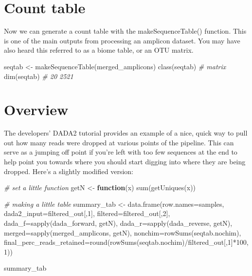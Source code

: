 \documentclass[
]{book}
\newenvironment{Shaded}{\begin{snugshade}}{\end{snugshade}}
\newcommand{\AttributeTok}[1]{\textcolor[rgb]{0.77,0.63,0.00}{#1}}
\newcommand{\CommentTok}[1]{\textcolor[rgb]{0.56,0.35,0.01}{\textit{#1}}}
\newcommand{\ControlFlowTok}[1]{\textcolor[rgb]{0.13,0.29,0.53}{\textbf{#1}}}
\newcommand{\DecValTok}[1]{\textcolor[rgb]{0.00,0.00,0.81}{#1}}
\newcommand{\FunctionTok}[1]{\textcolor[rgb]{0.00,0.00,0.00}{#1}}
\newcommand{\NormalTok}[1]{#1}
\newcommand{\OtherTok}[1]{\textcolor[rgb]{0.56,0.35,0.01}{#1}}
\newcommand{\SpecialCharTok}[1]{\textcolor[rgb]{0.00,0.00,0.00}{#1}}
\begin{document}
\hypertarget{count-table}{%
\section{Count table}\label{count-table}}

Now we can generate a count table with the makeSequenceTable() function. This is one of the main outputs from processing an amplicon dataset. You may have also heard this referred to as a biome table, or an OTU matrix.

\begin{Shaded}
\begin{Highlighting}[]
\NormalTok{seqtab }\OtherTok{\textless{}{-}} \FunctionTok{makeSequenceTable}\NormalTok{(merged\_amplicons)}
\FunctionTok{class}\NormalTok{(seqtab) }\CommentTok{\# matrix}
\FunctionTok{dim}\NormalTok{(seqtab) }\CommentTok{\# 20 2521}
\end{Highlighting}
\end{Shaded}

\hypertarget{overview}{%
\section{Overview}\label{overview}}

The developers' DADA2 tutorial provides an example of a nice, quick way to pull out how many reads were dropped at various points of the pipeline. This can serve as a jumping off point if you're left with too few sequences at the end to help point you towards where you should start digging into where they are being dropped. Here's a slightly modified version:

\begin{Shaded}
\begin{Highlighting}[]
  \CommentTok{\# set a little function}
\NormalTok{getN }\OtherTok{\textless{}{-}} \ControlFlowTok{function}\NormalTok{(x) }\FunctionTok{sum}\NormalTok{(}\FunctionTok{getUniques}\NormalTok{(x))}

  \CommentTok{\# making a little table}
\NormalTok{summary\_tab }\OtherTok{\textless{}{-}} \FunctionTok{data.frame}\NormalTok{(}\AttributeTok{row.names=}\NormalTok{samples, }\AttributeTok{dada2\_input=}\NormalTok{filtered\_out[,}\DecValTok{1}\NormalTok{],}
               \AttributeTok{filtered=}\NormalTok{filtered\_out[,}\DecValTok{2}\NormalTok{], }\AttributeTok{dada\_f=}\FunctionTok{sapply}\NormalTok{(dada\_forward, getN),}
               \AttributeTok{dada\_r=}\FunctionTok{sapply}\NormalTok{(dada\_reverse, getN), }\AttributeTok{merged=}\FunctionTok{sapply}\NormalTok{(merged\_amplicons, getN),}
               \AttributeTok{nonchim=}\FunctionTok{rowSums}\NormalTok{(seqtab.nochim),}
               \AttributeTok{final\_perc\_reads\_retained=}\FunctionTok{round}\NormalTok{(}\FunctionTok{rowSums}\NormalTok{(seqtab.nochim)}\SpecialCharTok{/}\NormalTok{filtered\_out[,}\DecValTok{1}\NormalTok{]}\SpecialCharTok{*}\DecValTok{100}\NormalTok{, }\DecValTok{1}\NormalTok{))}

\NormalTok{summary\_tab}
\end{Highlighting}
\end{Shaded}
\end{document}
